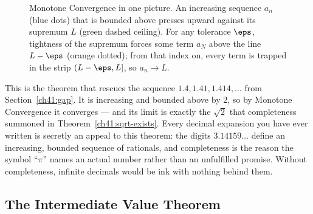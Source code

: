 \begin{figure}[H]
\centering
{}
\caption{Monotone Convergence in one picture. An increasing sequence $a_n$ (blue dots) that
is bounded above presses upward against its supremum $L$ (green dashed ceiling). For any
tolerance $\eps$, tightness of the supremum forces some term $a_N$ above the line $L-\eps$
(orange dotted); from that index on, every term is trapped in the strip $(L-\eps,L]$, so
$a_n\to L$.}
\label{ch41:fig-mct}
\end{figure}

\begin{connectionbox}
This is the theorem that rescues the sequence $1.4, 1.41, 1.414,\ldots$ from
Section~\ref{ch41:gap}. It is increasing and bounded above by $2$, so by Monotone
Convergence it converges --- and its limit is exactly the $\sqrt 2$ that completeness
summoned in Theorem~\ref{ch41:sqrt-exists}. Every decimal expansion you have ever written
is secretly an appeal to this theorem: the digits $3.14159\ldots$ define an increasing,
bounded sequence of rationals, and completeness is the reason the symbol ``$\pi$'' names
an actual number rather than an unfulfilled promise. Without completeness, infinite
decimals would be ink with nothing behind them.
\end{connectionbox}

\subsection*{The Intermediate Value Theorem}

